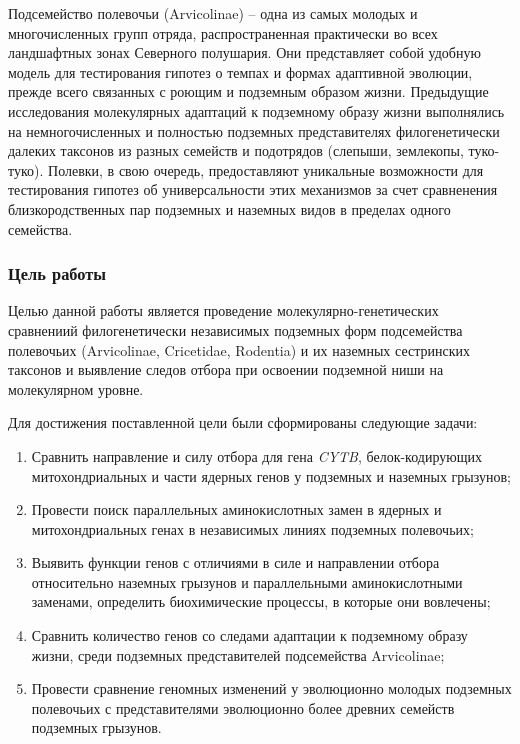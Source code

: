 Подсемейство полевочьи (Arvicolinae) -- одна из самых молодых и многочисленных групп отряда, распространенная практически во всех ландшафтных зонах Северного полушария. Они представляет собой удобную модель для тестирования гипотез о темпах и формах адаптивной эволюции, прежде всего связанных с роющим и подземным образом жизни. Предыдущие исследования молекулярных адаптаций к подземному образу жизни выполнялись на немногочисленных и полностью подземных представителях филогенетически далеких таксонов из разных семейств и подотрядов (слепыши, землекопы, туко-туко). Полевки, в свою очередь, предоставляют уникальные возможности для тестирования гипотез об универсальности этих механизмов за счет сравненения близкородственных пар подземных и наземных видов в пределах одного семейства. 

\subsubsection* {Цель работы}

Целью данной работы является проведение молекулярно-генетических сравнениий филогенетически независимых подземных форм подсемейства полевочьих (Arvicolinae, Cricetidae, Rodentia) и их наземных сестринских таксонов и выявление следов отбора при освоении подземной ниши на молекулярном уровне.
\vspace{0pt plus0.5fill}

Для достижения поставленной цели были сформированы следующие задачи:
\begin{enumerate}
	\item Сравнить направление и силу отбора для гена \textit{CYTB}, белок-кодирующих митохондриальных и части ядерных генов у подземных и наземных грызунов;
	\item Провести поиск параллельных аминокислотных замен в ядерных и митохондриальных генах в независимых линиях подземных полевочьих;
	\item Выявить функции генов с отличиями в силе и направлении отбора относительно наземных грызунов и параллельными аминокислотными заменами, определить биохимические процессы, в которые они вовлечены;
	\item Сравнить количество генов со следами адаптации к подземному образу жизни, среди подземных представителей подсемейства Arvicolinae;
	\item Провести сравнение геномных изменений у эволюционно молодых подземных полевочьих с представителями эволюционно более древних семейств подземных грызунов. 
\end{enumerate}
%

